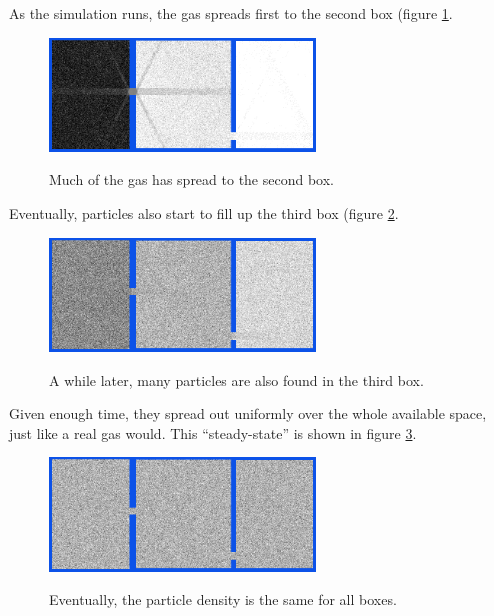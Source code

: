 \documentclass[12pt,a4paper]{article}
\begin{document}
As the simulation runs, the gas spreads first to the second box (figure \ref{diffusionbox2fill}.
\begin{figure}[htp]
\caption{Much of the gas has spread to the second box.}
\centering
  \includegraphics[width=200pt]{figs/diffusionbox2fill.png}
\label{diffusionbox2fill}
\end{figure}

Eventually, particles also start to fill up the third box (figure \ref{diffusionbox3fill}.
\begin{figure}[htp]
\caption{A while later, many particles are also found in the third box.}
\centering
  \includegraphics[width=200pt]{figs/diffusionbox3fill.png}
\label{diffusionbox3fill}
\end{figure}

Given enough time, they spread out uniformly over the whole available space, just like a real gas would.
This ``steady-state'' is shown in figure \ref{diffusionend}.
\begin{figure}[htp]
\caption{Eventually, the particle density is the same for all boxes.}
\centering
  \includegraphics[width=200pt]{figs/diffusionend.png}
\label{diffusionend}
\end{figure}
\end{document}

